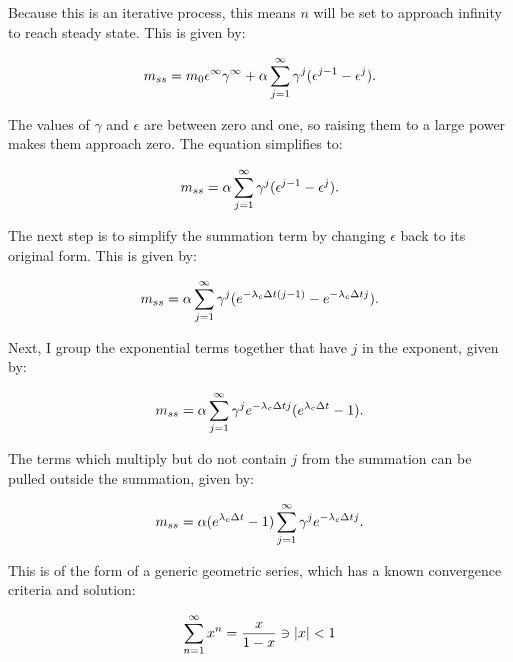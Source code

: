 Because this is an iterative process, this means $n$ will be set to approach infinity to reach steady state.
This is given by:

\begin{equation} \hfill
m_{ss} = m_0 \epsilon^{\infty} \gamma^{\infty} + \alpha \sum_{j=1}^{\infty} \gamma^j (\epsilon^{j-1} - \epsilon^j).
\hfill \end{equation}

The values of $\gamma$ and $\epsilon$ are between zero and one, so raising them to a large power makes them approach zero. The equation simplifies to:
 
\begin{equation} \hfill
m_{ss} = \alpha \sum_{j=1}^{\infty} \gamma^j (\epsilon^{j-1} - \epsilon^j).
\hfill \end{equation}

The next step is to simplify the summation term by changing $\epsilon$ back to its original form.
This is given by:

\begin{equation} \hfill
m_{ss} = \alpha \sum_{j=1}^{\infty} \gamma^j (e^{-\lambda_c \Delta t (j-1)} - e^{-\lambda_c \Delta t j}).
\hfill \end{equation}

Next, I group the exponential terms together that have $j$ in the exponent, given by:

\begin{equation} \hfill
m_{ss} = \alpha \sum_{j=1}^{\infty} \gamma^j e^{-\lambda_c \Delta t j} (e^{\lambda_c \Delta t} - 1).
\hfill \end{equation}

The terms which multiply but do not contain $j$ from the summation can be pulled outside the summation, given by:

\begin{equation} \hfill
m_{ss} = \alpha (e^{\lambda_c \Delta t} - 1) \sum_{j=1}^{\infty} \gamma^j e^{-\lambda_c \Delta t j}.
\hfill \end{equation}

This is of the form of a generic geometric series, which has a known convergence criteria and solution:

\begin{equation} \hfill
\sum_{n=1}^{\infty} x^n = \frac{x}{1-x} \ni |x| < 1
\hfill \end{equation}

